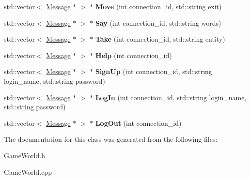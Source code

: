 \begin{DoxyCompactItemize}
\item 
\hypertarget{class_game_world_a6c0faa19f014214487640a2cba5a42b3}{}std\+::vector$<$ \hyperlink{class_message}{Message} $\ast$ $>$ $\ast$ {\bfseries Move} (int connection\+\_\+id, std\+::string exit)\label{class_game_world_a6c0faa19f014214487640a2cba5a42b3}

\item 
\hypertarget{class_game_world_a848640246968d179b8a21089c259691e}{}std\+::vector$<$ \hyperlink{class_message}{Message} $\ast$ $>$ $\ast$ {\bfseries Say} (int connection\+\_\+id, std\+::string words)\label{class_game_world_a848640246968d179b8a21089c259691e}

\item 
\hypertarget{class_game_world_a053eeb4dc3326c35445cbead4bfb275b}{}std\+::vector$<$ \hyperlink{class_message}{Message} $\ast$ $>$ $\ast$ {\bfseries Take} (int connection\+\_\+id, std\+::string entity)\label{class_game_world_a053eeb4dc3326c35445cbead4bfb275b}

\item 
\hypertarget{class_game_world_a9a8e91e94d04a41cfe7e9c05dd443cfd}{}std\+::vector$<$ \hyperlink{class_message}{Message} $\ast$ $>$ $\ast$ {\bfseries Help} (int connection\+\_\+id)\label{class_game_world_a9a8e91e94d04a41cfe7e9c05dd443cfd}

\item 
\hypertarget{class_game_world_a8c85401293c2100ddfa809f8b9620f29}{}std\+::vector$<$ \hyperlink{class_message}{Message} $\ast$ $>$ $\ast$ {\bfseries Sign\+Up} (int connection\+\_\+id, std\+::string login\+\_\+name, std\+::string password)\label{class_game_world_a8c85401293c2100ddfa809f8b9620f29}

\item 
\hypertarget{class_game_world_a6a37cb07099dcea1cf96225e6a77a2d9}{}std\+::vector$<$ \hyperlink{class_message}{Message} $\ast$ $>$ $\ast$ {\bfseries Log\+In} (int connection\+\_\+id, std\+::string login\+\_\+name, std\+::string password)\label{class_game_world_a6a37cb07099dcea1cf96225e6a77a2d9}

\item 
\hypertarget{class_game_world_aa0290dad894b4f618fb016ea2d072def}{}std\+::vector$<$ \hyperlink{class_message}{Message} $\ast$ $>$ $\ast$ {\bfseries Log\+Out} (int connection\+\_\+id)\label{class_game_world_aa0290dad894b4f618fb016ea2d072def}

\end{DoxyCompactItemize}


The documentation for this class was generated from the following files\+:\begin{DoxyCompactItemize}
\item 
Game\+World.\+h\item 
Game\+World.\+cpp\end{DoxyCompactItemize}
